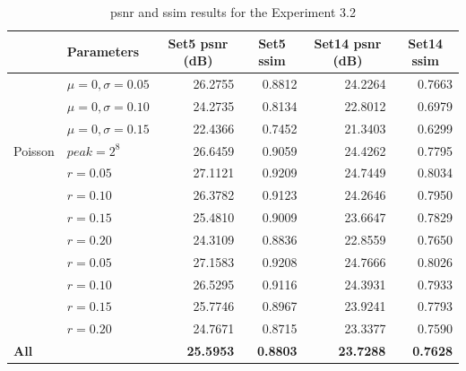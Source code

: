 \begin{table}[]
	\centering
	\begin{tabular}{|l|l|r|r|r|r|}
		\hline
		\rowcolor[HTML]{EFEFEF} 
		\multicolumn{1}{|c|}{\cellcolor[HTML]{EFEFEF}\textbf{Noise}} & \textbf{Parameters} & \multicolumn{1}{c|}{\cellcolor[HTML]{EFEFEF}\textbf{Set5 \gls{psnr} (dB)}} & \multicolumn{1}{c|}{\cellcolor[HTML]{EFEFEF}\textbf{Set5 \gls{ssim}}} & \multicolumn{1}{c|}{\cellcolor[HTML]{EFEFEF}\textbf{Set14 \gls{psnr} (dB)}} & \multicolumn{1}{c|}{\cellcolor[HTML]{EFEFEF}\textbf{Set14 \gls{ssim}}} \\ \hline
		\rowcolor[HTML]{FFFFFF} 
		\cellcolor[HTML]{EFEFEF} & $\mu=0, \sigma=0.05$ & 26.2755 & 0.8812 & 24.2264 & 0.7663 \\
		\rowcolor[HTML]{EFEFEF} 
		\cellcolor[HTML]{EFEFEF} & $\mu=0, \sigma=0.10$ & 24.2735 & 0.8134 & 22.8012 & 0.6979 \\
		\rowcolor[HTML]{FFFFFF} 
		\multirow{-3}{*}{\cellcolor[HTML]{EFEFEF}Gaussian} & $\mu=0, \sigma=0.15$ & 22.4366 & 0.7452 & 21.3403 & 0.6299 \\
		\rowcolor[HTML]{EFEFEF} 
		Poisson & $peak=2^8$ & 26.6459 & 0.9059 & 24.4262 & 0.7795 \\
		\rowcolor[HTML]{FFFFFF} 
		\cellcolor[HTML]{EFEFEF} & $r=0.05$ & 27.1121 & 0.9209 & 24.7449 & 0.8034 \\
		\rowcolor[HTML]{EFEFEF} 
		\cellcolor[HTML]{EFEFEF} & $r=0.10$ & 26.3782 & 0.9123 & 24.2646 & 0.7950 \\
		\rowcolor[HTML]{FFFFFF} 
		\cellcolor[HTML]{EFEFEF} & $r=0.15$ & 25.4810 & 0.9009 & 23.6647 & 0.7829 \\
		\rowcolor[HTML]{EFEFEF} 
		\multirow{-4}{*}{\cellcolor[HTML]{EFEFEF}Salt-and-pepper} & $r=0.20$ & 24.3109 & 0.8836 & 22.8559 & 0.7650 \\
		\rowcolor[HTML]{FFFFFF} 
		\cellcolor[HTML]{EFEFEF} & $r=0.05$ & 27.1583 & 0.9208 & 24.7666 & 0.8026 \\
		\rowcolor[HTML]{EFEFEF} 
		\cellcolor[HTML]{EFEFEF} & $r=0.10$ & 26.5295 & 0.9116 & 24.3931 & 0.7933 \\
		\rowcolor[HTML]{FFFFFF} 
		\cellcolor[HTML]{EFEFEF} & $r=0.15$ & 25.7746 & 0.8967 & 23.9241 & 0.7793 \\
		\rowcolor[HTML]{EFEFEF} 
		\multirow{-4}{*}{\cellcolor[HTML]{EFEFEF}Uniform} & $r=0.20$ & 24.7671 & 0.8715 & 23.3377 & 0.7590 \\
		\rowcolor[HTML]{FFFFFF} 
		\textbf{All} &  & \textbf{25.5953} & \textbf{0.8803} & \textbf{23.7288} & \textbf{0.7628}\\\hline
	\end{tabular}
	\caption{\gls{psnr} and \gls{ssim} results for the Experiment 3.2}
	\label{tab:experiment32}
\end{table}

